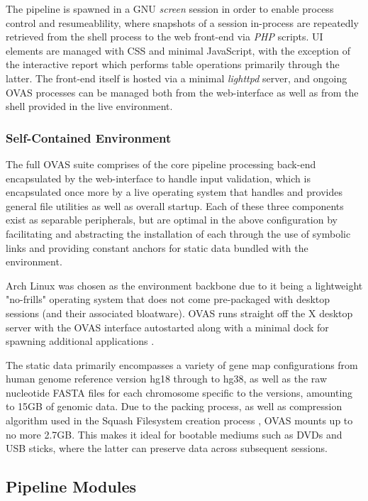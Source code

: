 \documentclass[twocolumn]{bmcart}%
\def\app{OVAS}
\begin{document}
The pipeline is spawned in a GNU \textit{screen} session in order to enable process control and resumeablility, where snapshots of a session in-process are repeatedly retrieved from the shell process to the web front-end via \textit{PHP} scripts. UI elements are managed with CSS and minimal JavaScript, with the exception of the interactive report which performs table operations primarily through the latter. The front-end itself is hosted via a minimal \textit{lighttpd} server, and ongoing \app{} processes can be managed both from the web-interface as well as from the shell provided in the live environment.


\subsubsection{Self-Contained Environment}

The full \app{} suite comprises of the core pipeline processing back-end encapsulated by the web-interface to handle input validation, which is encapsulated once more by a live operating system that handles and provides general file utilities as well as overall startup. Each of these three components exist as separable peripherals, but are optimal in the above configuration by facilitating and abstracting the installation of each through the use of symbolic links and providing constant anchors for static data bundled with the environment.

Arch Linux was chosen as the environment backbone due to it being a lightweight "no-frills" operating system that does not come pre-packaged with desktop sessions (and their associated bloatware). \app{} runs straight off the X desktop server with the \app{} interface autostarted along with a minimal dock for spawning additional applications \cite{scheifler1986x}.

The static data primarily encompasses a variety of gene map configurations from human genome reference version hg18 through to hg38, as well as the raw nucleotide FASTA files for each chromosome specific to the versions, amounting to 15GB of genomic data. Due to the packing process, as well as compression algorithm used in the Squash Filesystem creation process \cite{lougher2008squashfs}, \app{} mounts up to no more 2.7GB. This makes it ideal for bootable mediums such as DVDs and USB sticks, where the latter can preserve data across subsequent sessions.



\subsection{Pipeline Modules}
\end{document}
